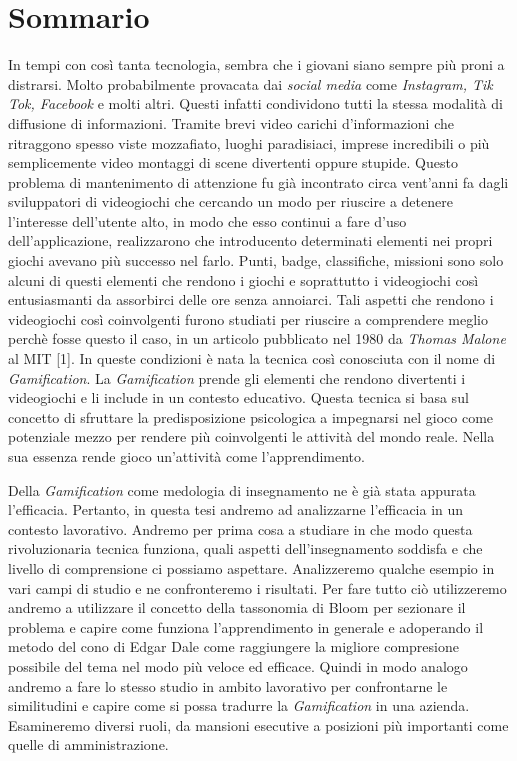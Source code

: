 \chapter*{Sommario}
\label{sommario}


In tempi con così tanta tecnologia, sembra che i giovani siano sempre più proni a distrarsi. Molto probabilmente provacata dai \textit{social media} come \textit{Instagram, Tik Tok, Facebook} e molti altri. Questi infatti condividono tutti la stessa modalità di diffusione di informazioni. Tramite brevi video carichi d'informazioni che ritraggono spesso viste mozzafiato, luoghi paradisiaci, imprese incredibili o più semplicemente video montaggi di scene divertenti oppure stupide.
Questo problema di mantenimento di attenzione fu già incontrato circa vent'anni fa dagli sviluppatori di videogiochi che cercando un modo per riuscire a detenere l'interesse dell'utente alto, in modo che esso continui a fare d'uso dell'applicazione, realizzarono che introducento determinati elementi nei propri giochi avevano più successo nel farlo. Punti, badge, classifiche, missioni sono solo alcuni di questi elementi che rendono i giochi e soprattutto i videogiochi così entusiasmanti da assorbirci delle ore senza annoiarci.
Tali aspetti che rendono i videogiochi così coinvolgenti furono studiati per riuscire a comprendere meglio perchè fosse questo il caso, in un articolo pubblicato nel 1980 da \textit{Thomas Malone} al MIT [1]. In queste condizioni è nata la tecnica così conosciuta con il nome di \textit{Gamification}. La \textit{Gamification} prende gli elementi che rendono divertenti i videogiochi e li include in un contesto educativo.
Questa tecnica si basa sul concetto di sfruttare la predisposizione psicologica a impegnarsi nel gioco come potenziale mezzo per rendere più coinvolgenti le attività del mondo reale. Nella sua essenza rende gioco un'attività come l'apprendimento.

Della \textit{Gamification} come medologia di insegnamento ne è già stata appurata l'efficacia. Pertanto, in questa tesi andremo ad analizzarne l'efficacia in un contesto lavorativo. Andremo per prima cosa a studiare in che modo questa rivoluzionaria tecnica funziona, quali aspetti dell'insegnamento soddisfa e che livello di comprensione ci possiamo aspettare. Analizzeremo qualche esempio in vari campi di studio e ne confronteremo i risultati. Per fare tutto ciò utilizzeremo andremo a utilizzare il concetto della tassonomia di Bloom per sezionare il problema e capire come funziona l'apprendimento in generale e adoperando il metodo del cono di Edgar Dale come raggiungere la migliore compresione possibile del tema nel modo più veloce ed efficace.
Quindi in modo analogo andremo a fare lo stesso studio in ambito lavorativo per confrontarne le similitudini e capire come si possa tradurre la \textit{Gamification} in una azienda. Esamineremo diversi ruoli, da mansioni esecutive a posizioni più importanti come quelle di amministrazione.



